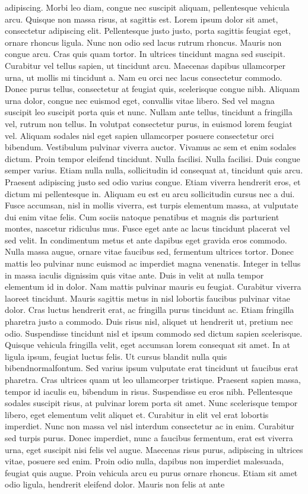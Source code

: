 \documentclass[letterpaper, twoside, 12pt,these,creativecommons,hyperref]{thETS}
\begin{document}
\begin{introduction}
adipiscing. Morbi leo diam, congue nec suscipit aliquam, pellentesque vehicula arcu. Quisque non massa risus, at sagittis est. Lorem ipsum dolor sit amet, consectetur adipiscing elit. Pellentesque justo justo, porta sagittis feugiat eget, ornare rhoncus ligula. Nunc non odio sed lacus rutrum rhoncus. Mauris non congue arcu. Cras quis quam tortor. In ultrices tincidunt magna sed suscipit. Curabitur vel tellus sapien, ut tincidunt arcu. Maecenas dapibus ullamcorper urna, ut mollis mi tincidunt a. Nam eu orci nec lacus consectetur commodo. Donec purus tellus, consectetur at feugiat quis, scelerisque congue nibh. Aliquam urna dolor, congue nec euismod eget, convallis vitae libero. Sed vel magna suscipit leo suscipit porta quis et nunc. Nullam ante tellus, tincidunt a fringilla vel, rutrum non tellus. In volutpat consectetur purus, in euismod lorem feugiat vel. Aliquam sodales nisl eget sapien ullamcorper posuere consectetur orci bibendum. Vestibulum pulvinar viverra auctor. Vivamus ac sem et enim sodales dictum. Proin tempor eleifend tincidunt. Nulla facilisi. Nulla facilisi. Duis congue semper varius. Etiam nulla nulla, sollicitudin id consequat at, tincidunt quis arcu. Praesent adipiscing justo sed odio varius congue. Etiam viverra hendrerit eros, et dictum mi pellentesque in. Aliquam eu est eu arcu sollicitudin cursus nec a dui. Fusce accumsan, nisl in mollis viverra, est turpis elementum massa, at vulputate dui enim vitae felis. Cum sociis natoque penatibus et magnis dis parturient montes, nascetur ridiculus mus. Fusce eget ante ac lacus tincidunt placerat vel sed velit. In condimentum metus et ante dapibus eget gravida eros commodo. Nulla massa augue, ornare vitae faucibus sed, fermentum ultrices tortor. Donec mattis leo pulvinar nunc euismod ac imperdiet magna venenatis. Integer in tellus in massa iaculis dignissim quis vitae ante. Duis in velit at nulla tempor elementum id in dolor. Nam mattis pulvinar mauris eu feugiat. Curabitur viverra laoreet tincidunt. Mauris sagittis metus in nisl lobortis faucibus pulvinar vitae dolor. Cras luctus hendrerit erat, ac fringilla purus tincidunt ac. Etiam fringilla pharetra justo a commodo. Duis risus nisl, aliquet ut hendrerit ut, pretium nec odio. Suspendisse tincidunt nisl et ipsum commodo sed dictum sapien scelerisque. Quisque vehicula fringilla velit, eget accumsan lorem consequat sit amet. In at ligula ipsum, feugiat luctus felis. Ut cursus blandit nulla quis bibendnormalfontum. Sed varius ipsum vulputate erat tincidunt ut faucibus erat pharetra. Cras ultrices quam ut leo ullamcorper tristique. Praesent sapien massa, tempor id iaculis eu, bibendum in risus. Suspendisse eu eros nibh. Pellentesque sodales suscipit risus, at pulvinar lorem porta sit amet. Nunc scelerisque tempor libero, eget elementum velit aliquet et. Curabitur in elit vel erat lobortis imperdiet. Nunc non massa vel nisl interdum consectetur ac in enim. Curabitur sed turpis purus. Donec imperdiet, nunc a faucibus fermentum, erat est viverra urna, eget suscipit nisi felis vel augue. Maecenas risus purus, adipiscing in ultrices vitae, posuere sed enim. Proin odio nulla, dapibus non imperdiet malesuada, feugiat quis augue. Proin vehicula arcu eu purus ornare rhoncus. Etiam sit amet odio ligula, hendrerit eleifend dolor. Mauris non felis at ante 
\end{introduction}
\end{document}
